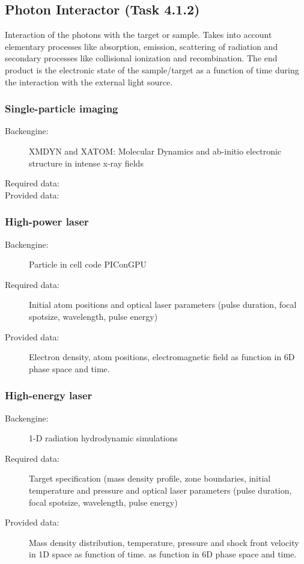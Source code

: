 \documentclass[12pt]{scrartcl}
\begin{document}
\subsection{Photon Interactor (Task 4.1.2)}
Interaction of the photons with the target or sample. Takes into account
elementary processes like absorption, emission, scattering of radiation and
secondary processes like collisional ionization and recombination. The end
product is the electronic state of the sample/target as a function of time
during the interaction with the external light source.
\subsubsection{Single-particle imaging}
\begin{description}
  \item[Backengine:] XMDYN and XATOM: Molecular Dynamics and ab-initio
    electronic structure in intense x-ray fields \cite{Jurek2016, Son2013,
    Ziaja2015}
  \item[Required data:]
  \item[Provided data:]
\end{description}

\subsubsection{High-power laser\label{sec:hpl}}
\begin{description}
  \item[Backengine:] Particle in cell code PIConGPU \cite{Bussmann2013}
  \item[Required data:] Initial atom positions and optical laser parameters
    (pulse duration, focal spotsize, wavelength, pulse energy)
  \item[Provided data:] Electron density, atom positions, electromagnetic field
    as function in 6D phase space and time.
\end{description}
%
\subsubsection{High-energy laser}
\begin{description}
  \item[Backengine:] 1-D radiation hydrodynamic simulations
  \item[Required data:] Target specification (mass density profile, zone
    boundaries, initial temperature and pressure and optical laser parameters
    (pulse duration, focal spotsize, wavelength, pulse energy)
  \item[Provided data:] Mass density distribution, temperature, pressure and
    shock front velocity in 1D space as function of time.
    as function in 6D phase space and time.
\end{description}
\end{document}
